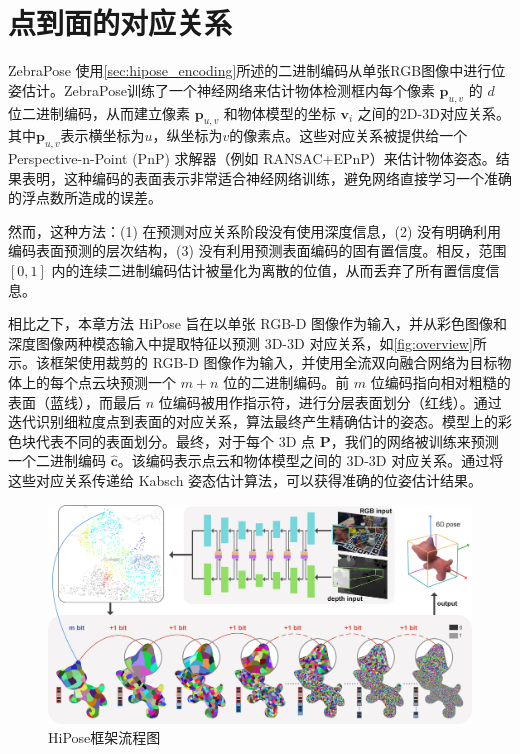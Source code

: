 \section{点到面的对应关系}

ZebraPose\cite{su2022zebrapose} 使用\autoref{sec:hipose_encoding}所述的二进制编码从单张RGB图像中进行位姿估计。ZebraPose训练了一个神经网络来估计物体检测框内每个像素 $\mathbf{p}_{u,v}$ 的 $d$ 位二进制编码，从而建立像素 $\mathbf{p}_{u,v}$ 和物体模型的坐标 $\mathbf{v}_{i}$ 之间的2D-3D对应关系。其中$\mathbf{p}_{u,v}$表示横坐标为$u$，纵坐标为$v$的像素点。这些对应关系被提供给一个Perspective-n-Point (PnP) 求解器（例如 RANSAC+EPnP\cite{EPnP}）来估计物体姿态。结果表明，这种编码的表面表示非常适合神经网络训练，避免网络直接学习一个准确的浮点数所造成的误差。

然而，这种方法：(1) 在预测对应关系阶段没有使用深度信息，(2) 没有明确利用编码表面预测的层次结构，(3) 没有利用预测表面编码的固有置信度。相反，范围 $[0,1]$ 内的连续二进制编码估计被量化为离散的位值，从而丢弃了所有置信度信息。

相比之下，本章方法 HiPose 旨在以单张 RGB-D 图像作为输入，并从彩色图像和深度图像两种模态输入中提取特征以预测 3D-3D 对应关系，如\autoref{fig:overview}所示。该框架使用裁剪的 RGB-D 图像作为输入，并使用全流双向融合网络为目标物体上的每个点云块预测一个 $m+n$ 位的二进制编码。前 $m$ 位编码指向相对粗糙的表面（蓝线），而最后 $n$ 位编码被用作指示符，进行分层表面划分（红线）。通过迭代识别细粒度点到表面的对应关系，算法最终产生精确估计的姿态。模型上的彩色块代表不同的表面划分。最终，对于每个 3D 点 $\mathbf{P}$，我们的网络被训练来预测一个二进制编码 $\hat{\mathbf{c}}$。该编码表示点云和物体模型之间的 3D-3D 对应关系。通过将这些对应关系传递给 Kabsch 姿态估计算法\cite{umeyama1991least}，可以获得准确的位姿估计结果。

\begin{figure}[ht]
    \centering
    \includegraphics[width=\textwidth]{figure/hipose/overview.png}
    \caption{HiPose框架流程图}
    \label{fig:overview}
\end{figure}

